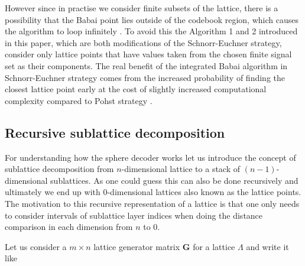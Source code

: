 \documentclass[english,12pt,a4paper,pdftex,sci,utf8]{aaltothesis}
\begin{document}
\par However since in practise we consider finite subsets of the lattice, there is a possibility that the Babai point lies outside of the codebook region, which causes the algorithm to loop infinitely \cite{agrell}. To avoid this the Algorithm 1 and 2 introduced in this paper, which are both modifications of the Schnorr-Euchner strategy, consider only lattice points that have values taken from the chosen finite signal set as their components. %
The real benefit of the integrated Babai algorithm in Schnorr-Euchner strategy comes from the increased probability of finding the closest lattice point early at the cost of slightly increased computational complexity compared to Pohst strategy \cite{agrell}. 

\subsection{Recursive sublattice decomposition}

For understanding how the sphere decoder works let us introduce the concept of sublattice decomposition from $n$-dimensional lattice to a stack of $(n-1)$-dimensional sublattices. As one could guess this can also be done recursively and ultimately we end up with 0-dimensional lattices also known as the lattice points. The motivation to this recursive representation of a lattice is that one only needs to consider intervals of sublattice layer indices when doing the distance comparison in each dimension from $n$ to $0$.
\par Let us consider a $m \times n$ lattice generator matrix $\mathbf{G}$ for a lattice $\Lambda$ and write it like
 
\end{document}
